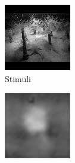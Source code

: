 \begin{figure}[H]
  \setcounter{subfigure}{0}
  \begin{subfigure}[t]{0.13\textwidth}
    \centering
    \includegraphics[width=\linewidth]{img/one-trial/stimulus_4.png}
    \caption{Stimuli}
  \end{subfigure}
  \begin{subfigure}[t]{0.13\textwidth}
    \centering
    \includegraphics[width=\linewidth]{img/one-trial/prediction_4_l1.png}

\end{subfigure}
\end{figure}
